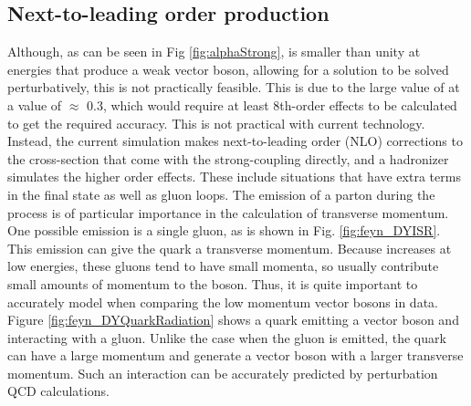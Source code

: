\subsection{Next-to-leading order production}
\label{sub:QCDimportance}
Although, as can be seen in Fig \ref{fig:alphaStrong}, \alphastrong is smaller than unity at energies that produce a weak vector boson, allowing for a solution to be solved perturbatively, this is not practically feasible. This is due to the large value of \alphastrong at a value of $\approx$ 0.3, which would require at least 8th-order effects to be calculated to get the required accuracy. This is not practical with current technology. Instead, the current simulation makes next-to-leading order (NLO) corrections to the cross-section that come with the strong-coupling directly, and a hadronizer simulates the higher order effects. These include situations that have extra terms in the final state as well as gluon loops.
The emission of a parton during the process is of particular importance in the calculation of transverse momentum. One possible emission is a single gluon, as is shown in Fig. \ref{fig:feyn_DYISR}. This emission can give the quark a transverse momentum. Because \alphastrong increases at low energies, these gluons tend to have small momenta, so usually contribute small amounts of momentum to the boson. Thus, it is quite important to accurately model when comparing the low momentum vector bosons in data. Figure \ref{fig:feyn_DYQuarkRadiation} shows a quark emitting a vector boson and interacting with a gluon. Unlike the case when the gluon is emitted, the quark can have a large momentum and generate a vector boson with a larger transverse momentum. Such an interaction can be accurately predicted by perturbation QCD calculations.




